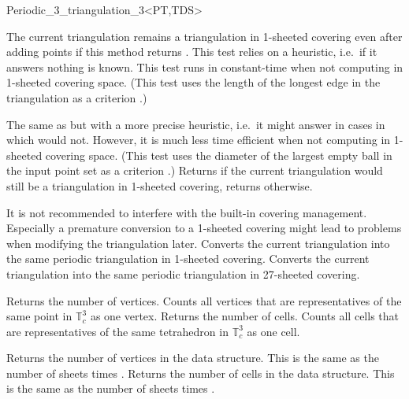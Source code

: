\begin{ccRefClass}{Periodic_3_triangulation_3<PT,TDS>}
\begin{ccAdvanced}
{The current triangulation remains a triangulation in 1-sheeted
  covering even after adding points if this method returns
  . This test relies on a heuristic, i.e.\ if it answers
   nothing is known. This test runs in constant-time when
  not computing in 1-sheeted covering space. (This test uses the length
of the longest edge in the triangulation as a
criterion \cite{cgal:ct-c3dpt-09}.)}

{The same as  but with
a more precise heuristic, i.e.\ it might answer  in cases in which
 would not. However, it is
much less time efficient when not computing in 1-sheeted covering
space. (This test uses the diameter of the largest empty ball in the
input point set as a criterion \cite{cgal:ct-c3dpt-09}.)}
\ccGlue
{}
{Returns  if the current triangulation would still be a
  triangulation in 1-sheeted covering, returns  otherwise.}

It is not recommended to interfere with the built-in covering
management. Especially a premature conversion to a 1-sheeted covering
might lead to problems when modifying the triangulation later.
{Converts the current triangulation into the same periodic
  triangulation in 1-sheeted covering.}
\ccGlue
{}
{Converts the current triangulation into the same periodic
  triangulation in 27-sheeted covering.}

\end{ccAdvanced}


{Returns the number of vertices. Counts all vertices that are
  representatives of the same point in $\mathbb T_c^3$ as one vertex.}
\ccGlue
{}
{Returns the number of cells. Counts all cells that are
  representatives of the same tetrahedron in $\mathbb T_c^3$ as one
  cell.}

\begin{ccAdvanced}
{Returns the number of vertices in the data structure. This is the
  same as the number of sheets times . }
\ccGlue
{}
{Returns the number of cells in the data structure. This is the same
  as the number of sheets times .}
\end{ccAdvanced}


\end{ccRefClass}
